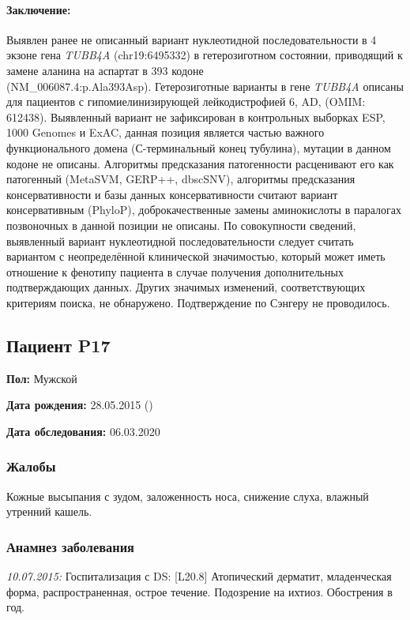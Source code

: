\documentclass[a4paper,14pt]{extarticle}
\newcommand{\genename}[1]{\textit{#1}}
\newcommand{\pdate}[1]{\emph{#1:} }
\newcommand{\DS}[2]{[#2] #1}
\begin{document}
\paragraph{Заключение:} Выявлен ранее не описанный вариант нуклеотидной последовательности в 4 экзоне гена \genename{TUBB4A} (chr19:6495332) в гетерозиготном состоянии, приводящий к замене аланина на аспартат в 393 кодоне\\ (NM\_006087.4:p.Ala393Asp).
Гетерозиготные варианты в гене \genename{TUBB4A} описаны для пациентов с гипомиелинизирующей лейкодистрофией 6, AD, (OMIM: 612438).
Выявленный вариант не зафиксирован в контрольных выборках ESP, 1000 Genomes и ExAC, данная позиция является частью важного функционального домена (С-терминальный конец тубулина), мутации в данном кодоне не описаны.
Алгоритмы предсказания патогенности расценивают его как патогенный (MetaSVM, GERP++, dbscSNV), алгоритмы предсказания консервативности и базы данных консервативности считают вариант консервативным (PhyloP), доброкачественные замены аминокислоты в паралогах позвоночных в данной позиции не описаны.
По совокупности сведений, выявленный вариант нуклеотидной последовательности следует считать вариантом с неопределённой клинической значимостью, который может иметь отношение к фенотипу пациента в случае получения дополнительных подтверждающих данных.
Других значимых изменений, соответствующих критериям поиска, не обнаружено.
Подтверждение по Сэнгеру не проводилось.


\newpage
\subsection*{Пациент P17}

\textbf{Пол:} Мужской

\textbf{Дата рождения:} 28.05.2015 ()

\textbf{Дата обследования:} 06.03.2020

\subsubsection*{Жалобы}

Кожные высыпания с зудом, заложенность носа, снижение слуха, влажный утренний кашель.

\subsubsection*{Анамнез заболевания}

\pdate{10.07.2015} Госпитализация с DS: \DS{Атопический дерматит, младенческая форма, распространенная, острое течение}{L20.8}. Подозрение на ихтиоз. Обострения  в год.
\end{document}
